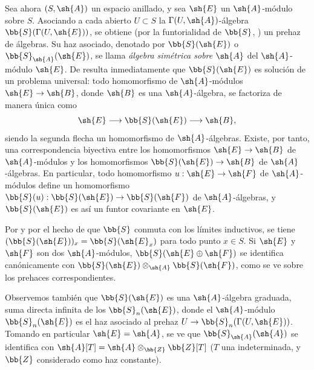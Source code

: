 \documentclass[oneside,10pt]{amsart}
\makeatletter
\newcommand{\ega@arrow}[2]{\mathchoice{#1}{#2}{#2}{#2}}
\renewcommand{\to}{\ega@arrow{\longrightarrow}{\rightarrow}}
\newcommand{\oldpage}[2][]{\marginnote{\normalfont\footnotesize\textbf{#1}~|~#2}\ignorespaces}
\let\EGAOriginalLabel\label
\renewcommand{\label}[1]{\phantomsection\EGAOriginalLabel{#1}}
\makeatother
\begin{document}
\begin{env}[1.7.4]
\label{II.1.7.4}
Sea ahora $(S,\sh{A})$ un espacio anillado, y sea $\sh{E}$ un $\sh{A}$-módulo sobre $S$.
Asociando a cada abierto $U\subset S$ la $\Gamma(U,\sh{A})$-álgebra $\bb{S}(\Gamma(U,\sh{E}))$, se obtiene (por la funtorialidad de $\bb{S}$, ) un prehaz de álgebras.
Su haz asociado, denotado por $\bb{S}(\sh{E})$ o $\bb{S}_\sh{A}(\sh{E})$, se llama \emph{álgebra simétrica sobre $\sh{A}$} del $\sh{A}$-módulo $\sh{E}$.
De  resulta inmediatamente que $\bb{S}(\sh{E})$ es solución de un problema universal: todo homomorfismo de $\sh{A}$-módulos $\sh{E}\to\sh{B}$, donde $\sh{B}$ es una $\sh{A}$-álgebra, se factoriza de manera única como
\[
  \sh{E}\to\bb{S}(\sh{E})\to\sh{B},
\]
siendo la segunda flecha un homomorfismo de $\sh{A}$-álgebras.
Existe, por tanto, una correspondencia biyectiva entre los homomorfismos $\sh{E}\to\sh{B}$ de $\sh{A}$-módulos y los homomorfismos $\bb{S}(\sh{E})\to\sh{B}$ de $\sh{A}$-álgebras.
En particular, todo homomorfismo $u:\sh{E}\to\sh{F}$ de $\sh{A}$-módulos define un homomorfismo $\bb{S}(u):\bb{S}(\sh{E})\to\bb{S}(\sh{F})$ de $\sh{A}$-álgebras, y $\bb{S}(\sh{E})$ es así un funtor covariante en $\sh{E}$.

\oldpage[II]{16}
Por  y por el hecho de que $\bb{S}$ conmuta con los límites inductivos, se tiene $(\bb{S}(\sh{E}))_x=\bb{S}(\sh{E}_x)$ para todo punto $x\in S$.
Si $\sh{E}$ y $\sh{F}$ son dos $\sh{A}$-módulos, $\bb{S}(\sh{E}\oplus\sh{F})$ se identifica canónicamente con $\bb{S}(\sh{E})\otimes_\sh{A}\bb{S}(\sh{F})$, como se ve sobre los prehaces correspondientes.

Observemos también que $\bb{S}(\sh{E})$ es una $\sh{A}$-álgebra graduada, suma directa infinita de los $\bb{S}_n(\sh{E})$, donde el $\sh{A}$-módulo $\bb{S}_n(\sh{E})$ es el haz asociado al prehaz $U\to\bb{S}_n(\Gamma(U,\sh{E}))$.
Tomando en particular $\sh{E}=\sh{A}$, se ve que $\bb{S}_\sh{A}(\sh{A})$ se identifica con $\sh{A}[T]=\sh{A}\otimes_\bb{Z}\bb{Z}[T]$ ($T$ una indeterminada, y $\bb{Z}$ considerado como haz constante).
\end{env}
\end{document}
